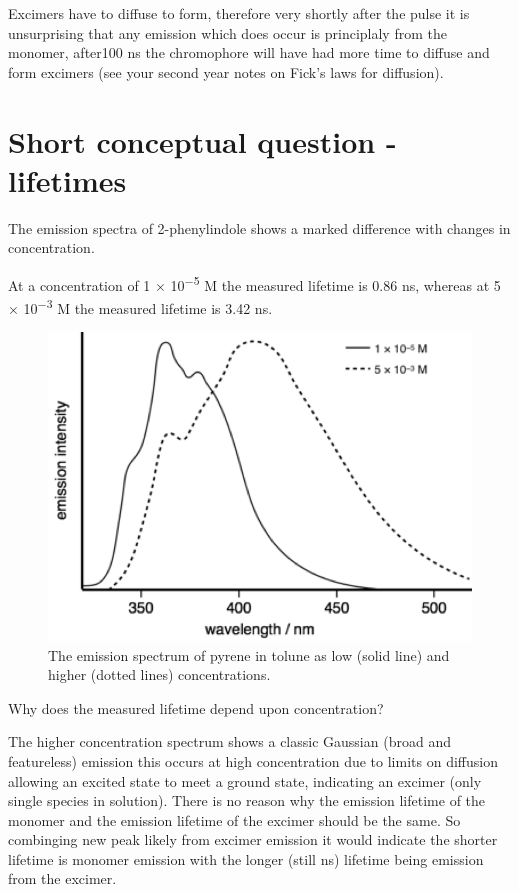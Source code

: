 \documentclass[
]{book}
\begin{document}
Excimers have to diffuse to form, therefore very shortly after the pulse it is unsurprising that any emission which does occur is principlaly from the monomer, after100 ns the chromophore will have had more time to diffuse and form excimers (see your second year notes on Fick's laws for diffusion).

\hypertarget{short-conceptual-question---lifetimes}{%
\section{Short conceptual question - lifetimes}\label{short-conceptual-question---lifetimes}}

The emission spectra of 2-phenylindole shows a marked difference with changes in concentration.

At a concentration of 1 × 10\textsuperscript{−5} M the measured lifetime is 0.86 ns, whereas at 5 × 10\textsuperscript{−3} M the measured lifetime is 3.42 ns.

\begin{figure}

{\centering \includegraphics[width=0.3\linewidth]{images/phenylindole} 

}

\caption{The emission spectrum of pyrene in tolune as low (solid line) and higher (dotted lines) concentrations.}\label{fig:phenylindole}
\end{figure}

Why does the measured lifetime depend upon concentration?

The higher concentration spectrum shows a classic Gaussian (broad and featureless) emission this occurs at high concentration due to limits on diffusion allowing an excited state to meet a ground state, indicating an excimer (only single species in solution). There is no reason why the emission lifetime of the monomer and the emission lifetime of the excimer should be the same. So combinging new peak likely from excimer emission it would indicate the shorter lifetime is monomer emission with the longer (still ns) lifetime being emission from the excimer.

  
\end{document}
